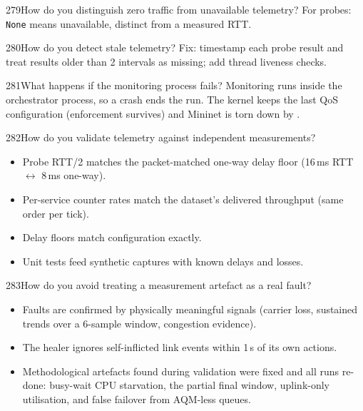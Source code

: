 \begin{qa}{279}{How do you distinguish zero traffic from unavailable telemetry?}
For probes: \texttt{None} means unavailable, distinct from a measured RTT.
\end{qa}

\begin{qa}{280}{How do you detect stale telemetry?}
Fix: timestamp each probe result and treat results older than 2 intervals as missing; add thread liveness checks.
\end{qa}

\begin{qa}{281}{What happens if the monitoring process fails?}
Monitoring runs inside the orchestrator process, so a crash ends the run. The kernel keeps the last QoS configuration
(enforcement survives) and Mininet is torn down by .
\end{qa}

\begin{qa}{282}{How do you validate telemetry against independent measurements?}
\begin{itemize}
\item Probe RTT/2 matches the packet-matched one-way delay floor (16\,ms RTT $\leftrightarrow$ 8\,ms one-way).
\item Per-service counter rates match the dataset's delivered throughput (same order per tick).
\item Delay floors match configuration exactly.
\item Unit tests feed synthetic captures with known delays and losses.
\end{itemize}
\end{qa}

\begin{qa}{283}{How do you avoid treating a measurement artefact as a real fault?}
\begin{itemize}
\item Faults are confirmed by physically meaningful signals (carrier loss, sustained trends over a 6-sample window,
congestion evidence).
\item The healer ignores self-inflicted link events within 1\,s of its own actions.
\item Methodological artefacts found during validation were fixed and all runs re-done: busy-wait CPU starvation,
the partial final window, uplink-only utilisation, and false failover from AQM-less queues.
\end{itemize}
\end{qa}

